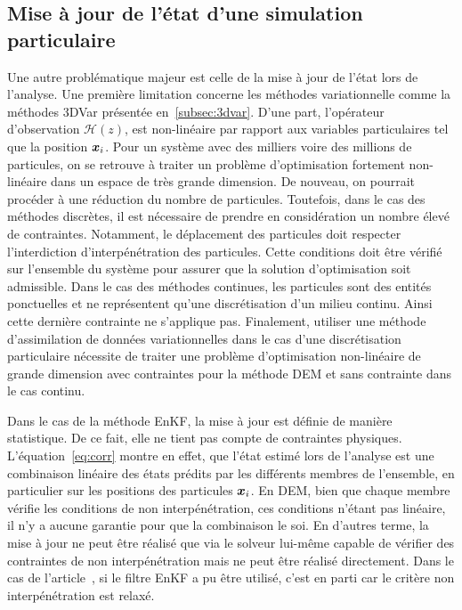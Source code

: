 \subsection{Mise à jour de l'état d'une simulation particulaire}

Une autre problématique majeur est celle de la mise à jour de l'état lors de l'analyse. Une première limitation concerne les méthodes variationnelle comme la méthodes 3DVar présentée en~\ref{subsec:3dvar}. D'une part, l'opérateur d'observation $\mathcal H(z)$, est non-linéaire par rapport aux variables particulaires tel que la position $\bm{x}_i$. Pour un système avec des milliers voire des millions de particules, on se retrouve à traiter un problème d'optimisation fortement non-linéaire dans un espace de très grande dimension. De nouveau, on pourrait procéder à une réduction du nombre de particules. Toutefois, dans le cas des méthodes discrètes, il est nécessaire de prendre en considération un nombre élevé de contraintes. Notamment, le déplacement des particules doit respecter l'interdiction d'interpénétration des particules. Cette conditions doit être vérifié sur l'ensemble du système pour assurer que la solution d'optimisation soit admissible. Dans le cas des méthodes continues, les particules sont des entités ponctuelles et ne représentent qu'une discrétisation d'un milieu continu. Ainsi cette dernière contrainte ne s'applique pas. Finalement, utiliser une méthode d'assimilation de données variationnelles dans le cas d'une discrétisation particulaire nécessite de traiter une problème d'optimisation non-linéaire de grande dimension avec contraintes pour la méthode DEM et sans contrainte dans le cas continu.

Dans le cas de la méthode EnKF, la mise à jour est définie de manière statistique. De ce fait, elle ne tient pas compte de contraintes physiques. L'équation~\ref{eq:corr} montre en effet, que l'état estimé lors de l'analyse est une combinaison linéaire des états prédits par les différents membres de l'ensemble, en particulier sur les positions des particules $\bm{x}_i$.
En DEM, bien que chaque membre vérifie les conditions de non interpénétration, ces conditions n'étant pas linéaire, il n'y a aucune garantie pour que la combinaison le soi. En d'autres terme, la mise à jour ne peut être réalisé que via le solveur lui-même capable de vérifier des contraintes de non interpénétration mais ne peut être réalisé directement. Dans le cas de l'article~\cite{chen_superfloe_2022}, si le filtre EnKF a pu être utilisé, c'est en parti car le critère non interpénétration est relaxé.

